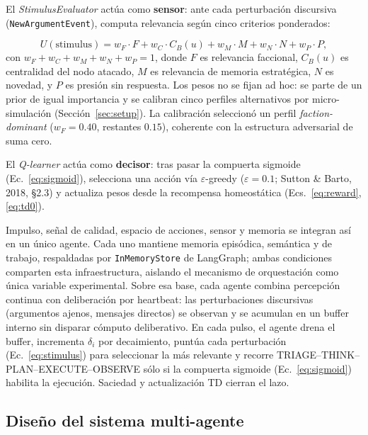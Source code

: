 \documentclass{llncs}
\begin{document}
El \emph{StimulusEvaluator} act\'ua como \textbf{sensor}: ante cada
perturbaci\'on discursiva (\texttt{NewArgumentEvent}), computa relevancia
seg\'un cinco criterios ponderados:

\begin{equation}
    U(\text{stimulus}) = w_F \cdot F + w_C \cdot C_B(u) + w_M \cdot M
        + w_N \cdot N + w_P \cdot P,
    \label{eq:stimulus}
\end{equation}
con $w_F + w_C + w_M + w_N + w_P = 1$, donde $F$ es relevancia faccional,
$C_B(u)$ es centralidad del nodo atacado, $M$ es relevancia de memoria
estrat\'egica, $N$ es novedad, y $P$ es presi\'on sin respuesta. Los pesos
no se fijan ad hoc: se parte de un prior de igual importancia y se calibran
cinco perfiles alternativos por micro-simulaci\'on
(Secci\'on~\ref{sec:setup}). La calibraci\'on seleccion\'o un perfil
\emph{faction-dominant} ($w_F{=}0.40$, restantes $0.15$), coherente con la
estructura adversarial de suma cero.

El \emph{Q-learner} act\'ua como \textbf{decisor}: tras pasar la compuerta
sigmoide (Ec.~\ref{eq:sigmoid}), selecciona una acci\'on v\'ia
$\varepsilon$-greedy ($\varepsilon=0.1$; Sutton \& Barto, 2018, \S2.3) y
actualiza pesos desde la recompensa homeost\'atica
(Ecs.~\ref{eq:reward}, \ref{eq:td0}).

Impulso, se\~nal de calidad, espacio de acciones, sensor y memoria se
integran as\'i en un \'unico agente. Cada uno mantiene
memoria epis\'odica, sem\'antica y de trabajo, respaldadas por
\texttt{InMemoryStore} de LangGraph; ambas condiciones comparten esta
infraestructura, aislando el mecanismo de orquestaci\'on como \'unica
variable experimental. Sobre esa base, cada agente combina percepci\'on
continua con deliberaci\'on por heartbeat: las perturbaciones
discursivas (argumentos ajenos, mensajes directos) se observan y se
acumulan en un buffer interno sin disparar c\'omputo deliberativo. En
cada pulso, el agente drena el buffer, incrementa $\delta_i$ por
decaimiento, punt\'ua cada perturbaci\'on (Ec.~\ref{eq:stimulus}) para
seleccionar la m\'as relevante y recorre TRIAGE--THINK--PLAN--EXECUTE--OBSERVE
s\'olo si la compuerta sigmoide (Ec.~\ref{eq:sigmoid}) habilita la
ejecuci\'on. Saciedad y actualizaci\'on TD cierran el lazo.

\subsection{Dise\~no del sistema multi-agente}
\end{document}
